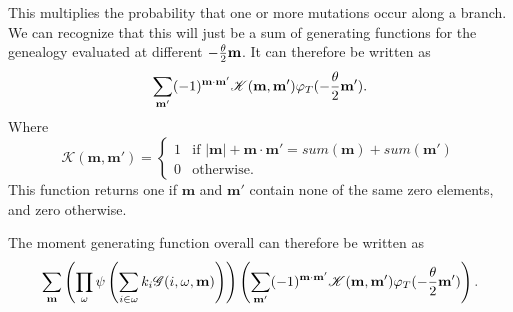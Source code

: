 This multiplies the probability that one or more mutations occur along a branch.
We can recognize that this will just be a sum of generating functions for the
genealogy evaluated at different $-\frac{\theta}{2} \mathbf{m}$. It can therefore be written as 
\begin{equation}
  \sum_{\mathbf{m}'}(-1)^{\mathbf{m} \cdot \mathbf{m}'}\mathscr{K}(\mathbf{m}, \mathbf{m}')\varphi_T(-\frac{\theta}{2} \mathbf{m}').
\end{equation}
Where
\[
\mathscr{K}(\mathbf{m}, \mathbf{m}') = 
\begin{cases}
  1 & \text{if } |\mathbf{m}| + \mathbf{m} \cdot \mathbf{m}' = sum(\mathbf{m}) + sum(\mathbf{m}')\\
  0 & \text{otherwise}.
\end{cases}
\]
This function returns one if $\mathbf{m}$ and $\mathbf{m}'$ contain none of the
same zero elements, and zero otherwise. 

The moment generating function overall can therefore be written as
\begin{equation}
  \sum_{\mathbf{m}}\left(\prod_{\omega} \psi\left(\sum_{i \in \omega} k_i 
\mathscr{G}(i, \omega, \mathbf{m}) \right) \right)
\left( \sum_{\mathbf{m}'}(-1)^{\mathbf{m} \cdot \mathbf{m}'}\mathscr{K}(\mathbf{m}, \mathbf{m}')
\varphi_T(-\frac{\theta}{2} \mathbf{m}')\right).
\end{equation}
